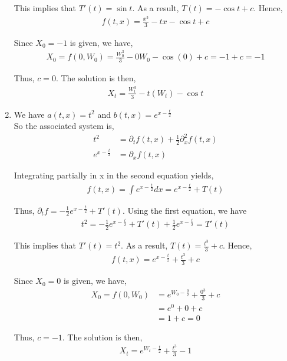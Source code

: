 \documentclass[12pt]{article}
\begin{document}
\begin{enumerate}[\alph*)]
This implies that $T'(t) = \sin t$. As a result, $T(t) = -\cos t + c$. Hence,
\begin{align*}
f(t,x) = \frac{x^3}{3} - tx - \cos t + c
\end{align*}

Since $X_0 = -1$ is given, we have,
\begin{align*}
X_0 = f(0, W_0) = \frac{W_0^3}{3} - 0W_0 - \cos(0) + c = -1 + c = -1
\end{align*}

Thus, $c = 0$. The solution is then,
\begin{align*}
X_t = \frac{W_t^3}{3} - t(W_t) - \cos t
\end{align*}

\item We have $a(t,x) = t^2$ and $b(t,x) = e^{x-\frac{t}{2}}$\\

So the associated system is,
\begin{align*}
t^2 &= \partial_t f(t,x) + \frac{1}{2} \partial_x^2 f(t,x)\\
e^{x-\frac{t}{2}} &= \partial_x f(t,x)
\end{align*}

Integrating partially in x in the second equation yields,
\begin{align*}
f(t,x) = \int e^{x-\frac{t}{2}} dx = e^{x-\frac{t}{2}} + T(t)
\end{align*}

Thus, $\partial_t f = -\frac{1}{2} e^{x-\frac{t}{2}} + T'(t)$. Using the first equation, we have
\begin{align*}
t^2 = -\frac{1}{2}e^{x-\frac{t}{2}} + T'(t) + \frac{1}{2}e^{x-\frac{t}{2}} = T'(t)
\end{align*}

This implies that $T'(t) = t^2$. As a result, $T(t) = \frac{t^3}{3} + c$. Hence,
\begin{align*}
f(t,x) = e^{x-\frac{t}{2}} + \frac{t^3}{3} + c
\end{align*}

Since $X_0 = 0$ is given, we have,
\begin{align*}
X_0 = f(0, W_0) &= e^{W_0 - \frac{0}{2}} + \frac{0^3}{3} + c\\
&= e^0 + 0 + c\\
&= 1 + c = 0
\end{align*}

Thus, $c = -1$. The solution is then,
\begin{align*}
X_t = e^{W_t-\frac{t}{2}} + \frac{t^3}{3} - 1
\end{align*}


\end{enumerate}
\end{document}

